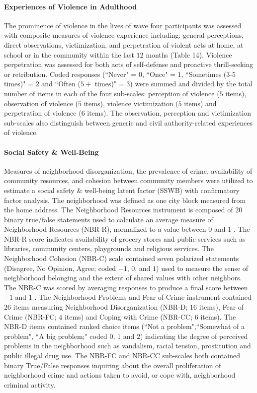 \documentclass[utf8]{article}
\begin{document}
\paragraph{Experiences of Violence in Adulthood} The prominence of violence in the lives of wave four participants was assessed with composite measures of violence experience including: general perceptions, direct observations, victimization, and perpetration of violent acts at home, at school or in the community within the last $12$ months (Table 14). Violence perpetration was assessed for both acts of self-defense and proactive thrill-seeking or retribution. Coded responses (``Never" = $0$, ``Once" = $1$, ``Sometimes ($3$-$5$ times)" = $2$ and ``Often ($5+$ times)" = $3$) were summed and divided by the total number of items in each of the four sub-scales: perception of violence ($5$ items), observation of violence ($5$ items), violence victimization ($5$ items) and perpetration of violence ($6$ items). The observation, perception and victimization sub-scales also distinguish between generic and civil authority-related experiences of violence. 
\paragraph{Social Safety \& Well-Being}
Measures of neighborhood disorganization, the prevalence of crime, availability of community resources, and cohesion between community members were utilized to estimate a social safety \& well-being latent factor (SSWB) with confirmatory factor analysis. The neighborhood was defined as one city block measured from the home address. The Neighborhood Resources instrument is composed of $20$ binary true/false statements used to calculate an average measure of Neighborhood Resources (NBR-R), normalized to a value between $0$ and $1$ \citep{tolan2001chicago}. The NBR-R score indicates availability of grocery stores and public services such as libraries, community centers, playgrounds and religious services. The Neighborhood Cohesion (NBR-C) scale contained seven polarized statements (Disagree, No Opinion, Agree; coded $-1$, $0$, and $1$) used to measure the sense of neighborhood belonging and the extent of shared values with other neighbors. The NBR-C was scored by averaging responses to produce a final score between $-1$ and $1$ \citep{perkins1990participation}. The Neighborhood Problems and Fear of Crime instrument contained $26$ items measuring Neighborhood Disorganization (NBR-D; $16$ items), Fear of Crime (NBR-FC; $4$ items) and Coping with Crime (NBR-CC; $6$ items). The NBR-D items contained ranked choice items (``Not a problem",``Somewhat of a problem", ``A big problem;" coded $0$, $1$ and $2$) indicating the degree of perceived problems in the neighborhood such as vandalism, racial tension, prostitution and public illegal drug use. The NBR-FC and NBR-CC sub-scales both contained binary True/False responses inquiring about the overall proliferation of neighborhood crime and actions taken to avoid, or cope with, neighborhood criminal activity. 
\end{document}
